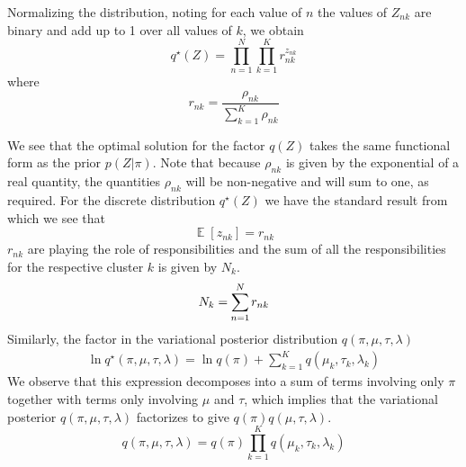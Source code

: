 \documentclass[conference]{IEEEtran}
\begin{document}
Normalizing the distribution, noting for each value of $n$ the values of $Z_{nk}$ are binary and add up to 1 over all values of $k$, we obtain
\begin{equation}
    q^\star(Z) = \prod_{n=1}^{N}\prod_{k=1}^{K} r_{nk}^{z_{nk}}
\end{equation}
where
\begin{equation}\label{rnk}
    r_{nk} = \frac{\rho_{nk}}{\sum_{k=1}^{K}\rho_{nk}}
\end{equation}

We see that the optimal solution for the factor $q(Z)$ takes the same functional form
as the prior $p(Z|\pi)$. Note that because $\rho_{nk}$ is given by the exponential of a real
quantity, the quantities $\rho_{nk}$ will be non-negative and will sum to one, as required.
For the discrete distribution $q^\star(Z)$ we have the standard result from which we see that
\begin{equation}
    \mathop{\mathbb{E}}[z_{nk}] = r_{nk}
\end{equation}
$r_{nk}$ are playing the role of responsibilities and the sum of all the responsibilities for the respective cluster $k$ is given by $N_k$.
\begin{equation}
    N_k = \sum_{\mathclap{n=1}}^{N}r_{nk}
\end{equation}
Similarly, the factor  in the variational posterior distribution $q(\pi, \mu, \tau, \lambda) $
\begin{equation}
    \begin{split}
        \ln q^\star (\pi, \mu, \tau, \lambda) = \ln q(\pi) +  \sum_{k=1}^{K} q(\mu_k, \tau_k, \lambda_k)
    \end{split}
\end{equation}
We observe that this expression decomposes into a sum of
terms involving only $\pi$ together with terms only involving $\mu$ and $\tau$, which implies
that the variational posterior $q(\pi, \mu, \tau, \lambda)$ factorizes to give $q(\pi)q(\mu, \tau, \lambda)$.\\
\begin{equation}
    q(\pi, \mu, \tau, \lambda) = q(\pi) \prod_{k=1}^{K} q(\mu_k, \tau_k, \lambda_k)
\end{equation}

\end{document}
